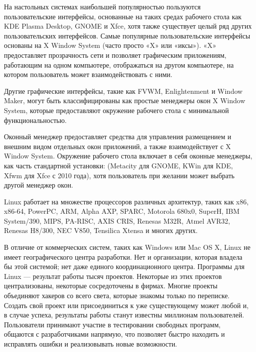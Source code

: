 На настольных системах наибольшей популярностью пользуются пользовательские интерфейсы, основанные на таких средах рабочего стола как KDE Plasma Desktop, GNOME и Xfce, хотя также существует целый ряд других пользовательских интерфейсов. Самые популярные пользовательские интерфейсы основаны на X Window System (часто просто «X» или «иксы»). «X» предоставляет прозрачность сети и позволяет графическим приложениям, работающим на одном компьютере, отображаться на другом компьютере, на котором пользователь может взаимодействовать с ними.

Другие графические интерфейсы, такие как FVWM, Enlightenment и Window Maker, могут быть классифицированы как простые менеджеры окон X Window System, которые предоставляют окружение рабочего стола с минимальной функциональностью.

Оконный менеджер предоставляет средства для управления размещением и внешним видом отдельных окон приложений, а также взаимодействует с X Window System. Окружение рабочего стола включает в себя оконные менеджеры, как часть стандартной установки: (Metacity для GNOME, KWin для KDE, Xfwm для Xfce с 2010 года), хотя пользователь при желании может выбрать другой менеджер окон.

Linux работает на множестве процессоров различных архитектур, таких как x86, x86-64, PowerPC, ARM, Alpha AXP, SPARC, Motorola 680x0, SuperH, IBM System/390, MIPS, PA-RISC, AXIS CRIS, Renesas M32R, Atmel AVR32, Renesas H8/300, NEC V850, Tensilica Xtensa и многих других.

В отличие от коммерческих систем, таких как Windows или Mac OS X, Linux не имеет географического центра разработки. Нет и организации, которая владела бы этой системой; нет даже единого координационного центра. Программы для Linux — результат работы тысяч проектов. Некоторые из этих проектов централизованы, некоторые сосредоточены в фирмах. Многие проекты объединяют хакеров со всего света, которые знакомы только по переписке. Создать свой проект или присоединиться к уже существующему может любой и, в случае успеха, результаты работы станут известны миллионам пользователей. Пользователи принимают участие в тестировании свободных программ, общаются с разработчиками напрямую, что позволяет быстро находить и исправлять ошибки и реализовывать новые возможности.